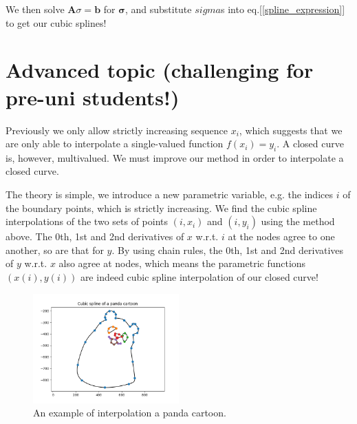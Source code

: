 \documentclass[paper=a4,fontsize=11pt]{scrartcl} %
\begin{document}
We then solve $\mathbf{A}{\sigma}= \mathbf{b}$ for $\mathbf{\sigma}$, and substitute $sigma$s into eq.[\ref{spline_expression}] to get our cubic splines! 

\section*{Advanced topic (challenging for pre-uni students!)}
Previously we only allow strictly increasing sequence $x_i$, which suggests that we are only able to interpolate a single-valued function $f(x_i)=y_i$. A closed curve is, however, multivalued. We must improve our method in order to interpolate a closed curve.

The theory is simple, we introduce a new parametric variable, e.g. the indices $i$ of the boundary points, which is strictly increasing. We find the cubic spline interpolations of the two sets of points $(i, x_i)$ and $(i, y_i)$ using the method above. The 0th, 1st and 2nd derivatives of $x$ w.r.t. $i$ at the nodes agree to one another, so are that for $y$. By using chain rules, the 0th, 1st and 2nd derivatives of $y$ w.r.t. $x$ also agree at nodes, which means the parametric functions $(x(i),y(i))$ are indeed cubic spline interpolation of our closed curve!

\begin{figure}[h!]
  \centering
  \includegraphics[width=0.5\textwidth]{interpolating_a_panda.png}
  \caption{An example of interpolation a panda cartoon.}
  \label{fig:random_interpolation}
\end{figure}


\end{document}
